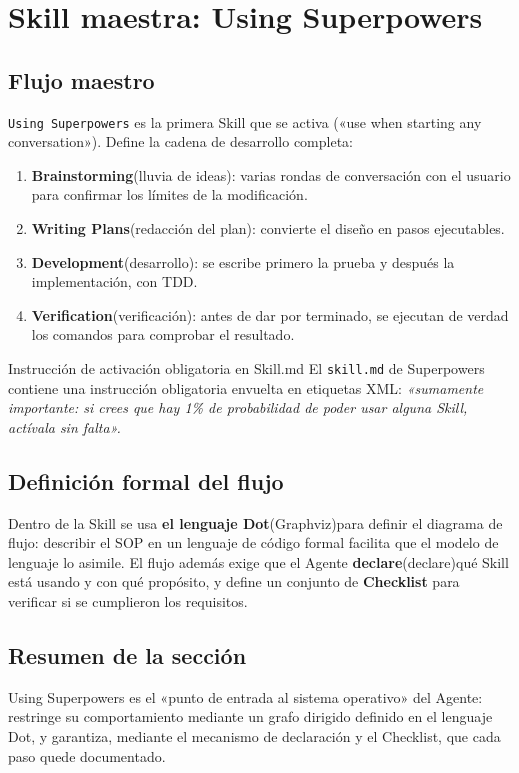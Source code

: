 \section{Skill maestra: Using Superpowers}

\subsection{Flujo maestro}

\texttt{Using Superpowers} es la primera Skill que se activa («use when starting any conversation»). Define la cadena de desarrollo completa:

\begin{enumerate}
    \item \textbf{Brainstorming}(lluvia de ideas): varias rondas de conversación con el usuario para confirmar los límites de la modificación.
    \item \textbf{Writing Plans}(redacción del plan): convierte el diseño en pasos ejecutables.
    \item \textbf{Development}(desarrollo): se escribe primero la prueba y después la implementación, con TDD.
    \item \textbf{Verification}(verificación): antes de dar por terminado, se ejecutan de verdad los comandos para comprobar el resultado.
\end{enumerate}

\begin{importantbox}{Instrucción de activación obligatoria en Skill.md}
El \texttt{skill.md} de Superpowers contiene una instrucción obligatoria envuelta en etiquetas XML: \textit{«sumamente importante: si crees que hay 1\% de probabilidad de poder usar alguna Skill, actívala sin falta».}
\end{importantbox}

\subsection{Definición formal del flujo}

Dentro de la Skill se usa \textbf{el lenguaje Dot}(Graphviz)para definir el diagrama de flujo: describir el SOP en un lenguaje de código formal facilita que el modelo de lenguaje lo asimile. El flujo además exige que el Agente \textbf{declare}(declare)qué Skill está usando y con qué propósito, y define un conjunto de \textbf{Checklist} para verificar si se cumplieron los requisitos.

\subsection{Resumen de la sección}

Using Superpowers es el «punto de entrada al sistema operativo» del Agente: restringe su comportamiento mediante un grafo dirigido definido en el lenguaje Dot, y garantiza, mediante el mecanismo de declaración y el Checklist, que cada paso quede documentado.

